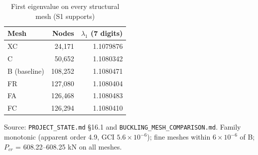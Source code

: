 \begin{table}[htbp]
\centering
\footnotesize
\caption{First eigenvalue on every structural mesh (S1 supports)}
\label{tab:appF}
\begin{tabular}{lrr}
\toprule
Mesh & Nodes & $\lambda_1$ (7 digits) \\
\midrule
XC & 24,171 & 1.1079876 \\
C & 50,652 & 1.1080342 \\
B (baseline) & 108,252 & 1.1080471 \\
FR & 127,080 & 1.1080404 \\
FA & 126,468 & 1.1080483 \\
FC & 126,294 & 1.1080410 \\
\bottomrule
\end{tabular}
\par\smallskip\parbox{\linewidth}{\footnotesize\raggedright Source: \texttt{PROJECT\_STATE.md} \S16.1 and \texttt{BUCKLING\_MESH\_COMPARISON.md}. Family monotonic (apparent order 4.9, GCI $5.6\times10^{-6}$); fine meshes within $6\times10^{-6}$ of B; $P_{cr}$ = 608.22--608.25 kN on all meshes.}
\end{table}
